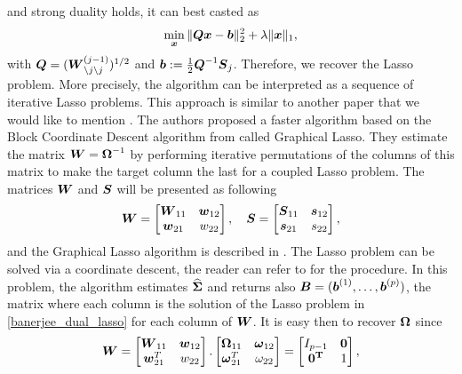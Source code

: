 and strong duality holds, it can best casted as
\begin{equation}
\label{banerjee_dual_lasso}
  \min_{\boldsymbol x} \|\boldsymbol Q\boldsymbol x - \boldsymbol b\|_2^2 + \lambda\|\boldsymbol x\|_1,
\end{equation}
with $\boldsymbol Q = (\boldsymbol W_{\setminus j \setminus j}^{(j-1)})^{1/2}$ and $\boldsymbol b:=\frac{1}{2}\boldsymbol Q^{-1}\boldsymbol S_j$. Therefore, we recover the Lasso problem. More precisely, the algorithm can be interpreted as a sequence of iterative Lasso problems. This approach is similar to another paper that we would like to mention \citep{glasso07}. The authors proposed a faster algorithm based on the Block Coordinate Descent algorithm from \citep{banerjee} called Graphical Lasso. They estimate the matrix $\boldsymbol W=\boldsymbol\Omega^{-1}$ by performing iterative permutations of the columns of this matrix to make the target column the last for a coupled Lasso problem. The matrices $\boldsymbol W$ and $\boldsymbol S$ will be presented as following 
\begin{equation}
\boldsymbol W =  \begin{bmatrix}
    \boldsymbol W_{11} & \boldsymbol w_{12} \\
    \boldsymbol w_{21} & w_{22}
  \end{bmatrix}, 
  \quad
 \boldsymbol S =  \begin{bmatrix}
    \boldsymbol S_{11} & \boldsymbol s_{12} \\
    \boldsymbol s_{21} & s_{22}
  \end{bmatrix}, 
\end{equation}
and the Graphical Lasso algorithm is described in . The Lasso problem can be solved via a coordinate descent, the reader can refer to \citep{glasso07} for the procedure. In this problem, the algorithm estimates $\widehat{\boldsymbol\Sigma}$ and returns also $\boldsymbol B = (\boldsymbol b^{(1)},\dots,\boldsymbol b^{(p)})$, the matrix where each column is the solution of the Lasso problem in \cref{banerjee_dual_lasso} for each column of $\boldsymbol W$. It is easy then to recover $\boldsymbol\Omega$ since 
\begin{equation}
\boldsymbol W =  \begin{bmatrix}
    \boldsymbol W_{11} & \boldsymbol w_{12} \\
    \boldsymbol w_{21}^T & w_{22}
  \end{bmatrix}.
  \begin{bmatrix}
    \boldsymbol\Omega_{11} & \boldsymbol \omega_{12} \\
    \boldsymbol \omega_{21}^T & \omega_{22}
  \end{bmatrix}=
   \begin{bmatrix}
    I_{p-1} & \bf{0} \\
    \bf{0}^T & 1
  \end{bmatrix},
\end{equation}

